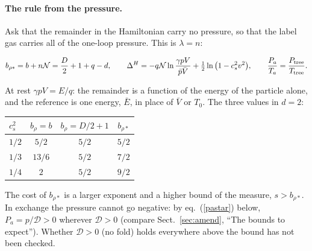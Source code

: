\documentclass[11pt,aps,preprint,nofootinbib,superscriptaddress,tightenlines]{revtex4-2}
\def\st{\begin{equation}}
\def\stp{\end{equation}}
\def\Eq#1{eq.~(\ref{#1})}
\def\Sect#1{Sect.~\ref{#1}}
\let\oldparagraph\paragraph
\renewcommand{\paragraph}{\par\bigskip\oldparagraph}
\begin{document}
\paragraph{The rule from the pressure.}  Ask that the remainder in the Hamiltonian carry no pressure, so that the label gas carries all of the
one-loop pressure.  This is $\lambda=n$:
\begin{keyeq}
\st
b_{\rho*}=b+n\mathcal N=\frac D2+1+q-d,\qquad
\Delta^H=-q\mathcal N\ln\frac{\gamma pV}{\bar p\bar V}+\tfrac12\ln\big(1-c_s^2v^2\big),\qquad \frac{P_a}{T_a}=\frac{P_{\rm tree}}{T_{\rm tree}} .
\label{betastar}
\stp
\end{keyeq}
At rest $\gamma pV=E/q$: the remainder is a function of the energy of the particle alone, and the reference is one energy, $\bar E$, in place of
$\bar V$ or $T_0$.  The three values in $d=2$:
\begin{center}
\begin{tabular}{lccc}
\toprule
$c_s^2$ & $b_\rho=b$ & $b_\rho=D/2+1$ & $b_{\rho*}$ \\
\midrule
$1/2$ & $5/2$ & $5/2$ & $5/2$ \\
$1/3$ & $13/6$ & $5/2$ & $7/2$ \\
$1/4$ & $2$ & $5/2$ & $9/2$ \\
\bottomrule
\end{tabular}
\end{center}
The cost of $b_{\rho*}$ is a larger exponent and a higher bound of the measure, $s>b_{\rho*}$.  In exchange the pressure cannot go negative: by \Eq{pastar} below, $P_a=p/\mathcal D>0$ wherever $\mathcal D>0$
(compare \Sect{sec:amend}, ``The bounds to expect'').  Whether $\mathcal D>0$ (no fold) holds everywhere above the bound has not been checked.
\end{document}

